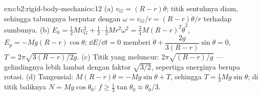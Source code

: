 \begin{solution}{exo:b2:rigid-body-mechanics:12}
(a) $v_G = (R - r)\dot\theta$; titik sentuhnya diam, sehingga tabungnya
berputar dengan $\omega = v_G/r = (R - r)\dot\theta/r$ terhadap sumbunya.
(b) $E_k = \tfrac12Mv_G^2 + \tfrac12\cdot\tfrac12Mr^2\omega^2 = \tfrac34M(R - r)^2
\dot\theta^2$, $E_p = -Mg(R - r)\cos\theta$; $\dd E/\dd t = 0$ memberi $\ddot\theta
+ \dfrac{2g}{3(R - r)}\sin\theta = 0$, $T = 2\pi\sqrt{3(R - r)/2g}$. (c) Titik
yang meluncur: $2\pi\sqrt{(R - r)/g}$ --- gelindingnya lebih lambat dengan
faktor $\sqrt{3/2}$, sepertiga energinya berupa rotasi. (d) Tangensial: $M(R - r)\ddot\theta =
-Mg\sin\theta + T$, sehingga $T = \tfrac13Mg\sin\theta$; di titik baliknya
$N = Mg\cos\theta_0$: $f \ge \tfrac13\tan\theta_0 \approx \theta_0/3$.
\end{solution}

